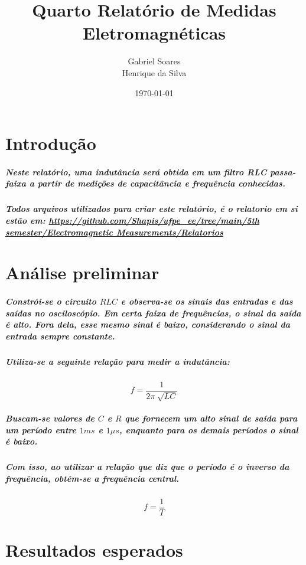 \documentclass[12pt,twoside, a4paper, twocolumn]{article}
\title{Quarto Relatório de Medidas Eletromagnéticas}
\author{Gabriel Soares \\ Henrique da Silva}
\date{\today}
\begin{document}
\maketitle
{}
\newpage
\tableofcontents
\newpage






\section{Introdução}




\subparagraph*{Neste relatório, uma indutância será obtida em um filtro RLC passa-faixa a partir de medições de capacitância e frequência conhecidas.}


\subparagraph*{Todos arquivos utilizados para criar este relatório, é o relatorio em si estão em:  \url{https://github.com/Shapis/ufpe_ee/tree/main/5th semester/Electromagnetic Measurements/Relatorios}}








\section{Análise preliminar}


\subparagraph*{Constrói-se o circuito $RLC$ e observa-se os sinais das entradas e das saídas no osciloscópio. Em certa faixa de frequências, o sinal da saída é alto. Fora dela, esse mesmo sinal é baixo, considerando o sinal da entrada sempre constante.}


\subparagraph*{Utiliza-se a seguinte relação para medir a indutância:}


\begin{equation}
    f = \frac{1}{2 \pi \sqrt[]{LC}}
\end{equation}


\subparagraph*{Buscam-se valores de $C$ e $R$ que fornecem um alto sinal de saída para um período entre $1ms$ e $1\mu s$, enquanto para os demais períodos o sinal é baixo.}


\subparagraph*{Com isso, ao utilizar a relação que diz que o período é o inverso da frequência, obtém-se a frequência central.}


\begin{equation}
    f = \frac{1}{T}
\end{equation}


\section{Resultados esperados}
\end{document}
